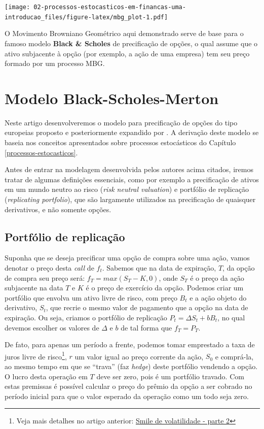 \documentclass[]{book}
\let\rmarkdownfootnote\footnote%
\def\footnote{\protect\rmarkdownfootnote}
\begin{document}
\texttt{[image: 02-processos-estocasticos-em-financas-uma-introducao\_files/figure-latex/mbg\_plot-1.pdf]}

O Movimento Browniano Geométrico aqui demonstrado serve de base para o
famoso modelo \textbf{Black \& Scholes} de precificação de opções, o
qual assume que o ativo subjacente à opção (por exemplo, a ação de uma
empresa) tem seu preço formado por um processo MBG.

\hypertarget{bsm}{\chapter{Modelo Black-Scholes-Merton}\label{bsm}}

Neste artigo desenvolveremos o modelo para precificação de opções do
tipo europeias proposto \citet{Black1973} e posteriormente expandido por
\citet{Merton1976}. A derivação deste modelo se baseia nos conceitos
apresentados sobre processos estocásticos do Capítulo
\ref{processos-estocasticos}.

Antes de entrar na modelagem desenvolvida pelos autores acima citados,
iremos tratar de algumas definições essenciais, como por exemplo a
precificação de ativos em um mundo neutro ao risco (\emph{risk neutral
valuation}) e portfólio de replicação (\emph{replicating portfolio}),
que são largamente utilizados na precificação de quaisquer derivativos,
e não somente opções.

\section{Portfólio de replicação}\label{portfolio-de-replicacao}

Suponha que se deseja precificar uma opção de compra sobre uma ação,
vamos denotar o preço desta \emph{call} de \(f_t\). Sabemos que na data
de expiração, \(T\), da opção de compra seu preço será:
\(f_T=max(S_T - K, 0)\), onde \(S_T\) é o preço da ação subjacente na
data \(T\) e \(K\) é o preço de exercício da opção. Podemos criar um
portfólio que envolva um ativo livre de risco, com preço \(B_t\) e a
ação objeto do derivativo, \(S_t\), que recrie o mesmo valor de
pagamento que a opção na data de expiração. Ou seja, criamos o portfólio
de replicação \(P_t=\Delta S_t + b B_t\), no qual devemos escolher os
valores de \(\Delta\) e \(b\) de tal forma que \(f_T = P_T\).

De fato, para apenas um período a frente, podemos tomar emprestado a
taxa de juros livre de risco\footnote{Veja mais detalhes no artigo
  anterior: \href{/2019/01/25/smile-de-volatilidade-parte-2}{Smile de
  volatilidade - parte 2}}, \(r\) um valor igual ao preço corrente da
ação, \(S_0\) e comprá-la, ao mesmo tempo em que se ``trava'' (faz
\emph{hedge}) deste portfólio vendendo a opção. O lucro desta operação
em \(T\) deve ser zero, pois é um portfólio travado. Com estas premissas
é possível calcular o preço do prêmio da opção a ser cobrado no período
inicial para que o valor esperado da operação como um todo seja zero.
\end{document}
